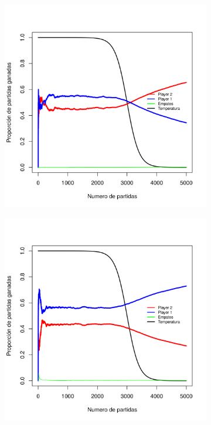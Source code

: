 \documentclass[shownotes]{beamer}
\begin{document}
\begin{frame}{}


\begin{figure}[H]
    \centering
    \begin{subfigure}[b]{0.45\textwidth}
      \includegraphics[width=\textwidth]{../Imagenes/SinVision_disipacion_QsinVison_reverse}
    \end{subfigure}
\end{figure}

\end{frame}


\begin{frame}{}


\begin{figure}[H]
    \centering
    \begin{subfigure}[b]{0.45\textwidth}
      \includegraphics[width=\textwidth]{../Imagenes/SinVision_disipacion_QconVison}
    \end{subfigure}
\end{figure}

\end{frame}
\end{document}
